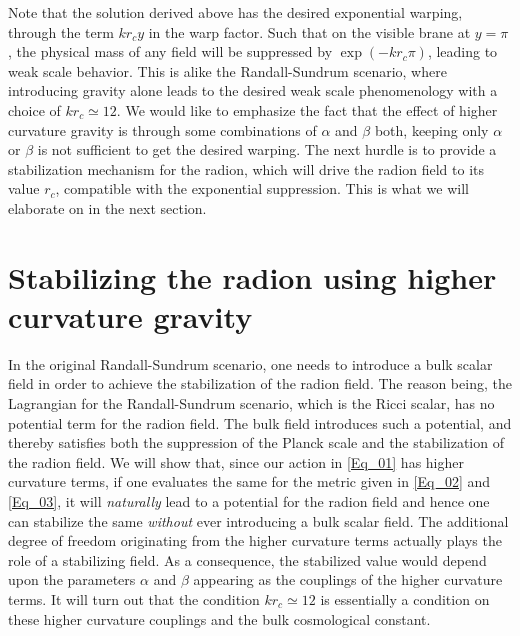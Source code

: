\documentclass{article}
\begin{document}
Note that the solution derived above has the desired exponential warping, through the term $kr_{c}y$ in the warp factor. Such that on the visible brane at $y=\pi$, the physical mass of any field will be suppressed by $\exp(-kr_{c}\pi)$, leading to weak scale behavior. This is alike the Randall-Sundrum scenario, where introducing gravity alone leads to the desired weak scale phenomenology with a choice of $kr_{c}\simeq 12$. We would like to emphasize the fact that the effect of higher curvature gravity is through some combinations of $\alpha$ and $\beta$ both, keeping only $\alpha$ or $\beta$ is not sufficient to get the desired warping. The next hurdle is to provide a stabilization mechanism for the radion, which will drive the radion field to its value $r_{c}$, compatible with the exponential suppression. This is what we will elaborate on in the next section.
\section{Stabilizing the radion using higher curvature gravity}\label{Sec_03}

In the original Randall-Sundrum scenario, one needs to introduce a bulk scalar field in order to achieve the stabilization of the radion field. The reason being, the Lagrangian for the Randall-Sundrum scenario, which is the Ricci scalar, has no potential term for the radion field. The bulk field introduces such a potential, and thereby satisfies both the suppression of the Planck scale and the stabilization of the radion field. We will show that, since our action in \ref{Eq_01} has higher curvature terms, if one evaluates the same for the metric given in \ref{Eq_02} and \ref{Eq_03}, it will \emph{naturally} lead to a potential for the radion field and hence one can stabilize the same \emph{without} ever introducing a bulk scalar field. The additional degree of freedom originating from the higher curvature terms actually plays the role of a stabilizing field. As a consequence, the stabilized value would depend upon the parameters $\alpha$ and $\beta$ appearing as the couplings of the higher curvature terms. It will turn out that the condition $kr_{c}\simeq 12$ is essentially a condition on these higher curvature couplings and the bulk cosmological constant. 
\end{document}
